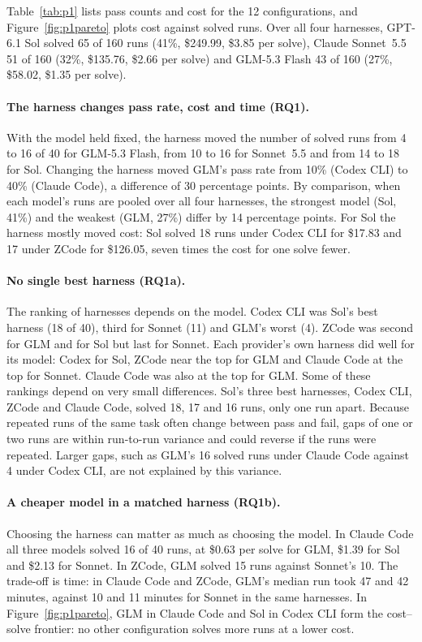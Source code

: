 Table~\ref{tab:p1} lists pass counts and cost for the 12 configurations, and Figure~\ref{fig:p1pareto} plots
cost against solved runs. Over all four harnesses, GPT-6.1 Sol solved 65 of 160 runs (41\%, \$249.99, \$3.85 per
solve), Claude Sonnet~5.5 51 of 160 (32\%, \$135.76, \$2.66 per solve) and GLM-5.3 Flash 43 of 160 (27\%,
\$58.02, \$1.35 per solve).

\paragraph{The harness changes pass rate, cost and time (RQ1).}
With the model held fixed, the harness moved the number of solved runs from 4 to 16 of 40 for GLM-5.3 Flash,
from 10 to 16 for Sonnet~5.5 and from 14 to 18 for Sol. Changing the harness moved GLM's pass rate from 10\% (Codex
CLI) to 40\% (Claude Code), a difference of 30 percentage points. By comparison, when each model's runs are pooled
over all four harnesses, the strongest model (Sol, 41\%) and the weakest (GLM, 27\%) differ by 14 percentage
points. For Sol
the harness mostly moved cost: Sol solved 18 runs under Codex CLI for \$17.83 and 17 under ZCode for \$126.05,
seven times the cost for one solve fewer.

\paragraph{No single best harness (RQ1a).}
The ranking of harnesses depends on the model. Codex CLI was Sol's best harness (18 of 40), third for Sonnet
(11) and GLM's worst (4). ZCode was second for GLM and for Sol but last for Sonnet. Each provider's own harness
did well for its model: Codex for Sol, ZCode near the top for GLM and Claude Code at the top for Sonnet.
Claude Code was also at the top for GLM. Some of these rankings depend on very small differences. Sol's three best
harnesses, Codex CLI, ZCode and Claude Code, solved 18, 17 and 16 runs, only one run apart. Because repeated runs of
the same task often change between pass and fail, gaps of one or two runs are within run-to-run variance and
could reverse if the runs were repeated. Larger gaps, such as GLM's 16 solved runs under Claude Code against 4
under Codex CLI, are not explained by this variance.

\paragraph{A cheaper model in a matched harness (RQ1b).}
Choosing the harness can matter as much as choosing the model. In Claude Code all three models solved 16 of 40
runs, at \$0.63 per solve for GLM, \$1.39 for Sol and \$2.13 for Sonnet. In ZCode, GLM solved 15 runs against
Sonnet's 10. The trade-off is time: in Claude Code and ZCode, GLM's median run took 47 and 42 minutes, against 10
and 11 minutes for Sonnet in the same harnesses. In Figure~\ref{fig:p1pareto}, GLM in Claude Code and Sol in Codex
CLI form the cost--solve frontier: no other configuration solves more runs at a lower cost.

